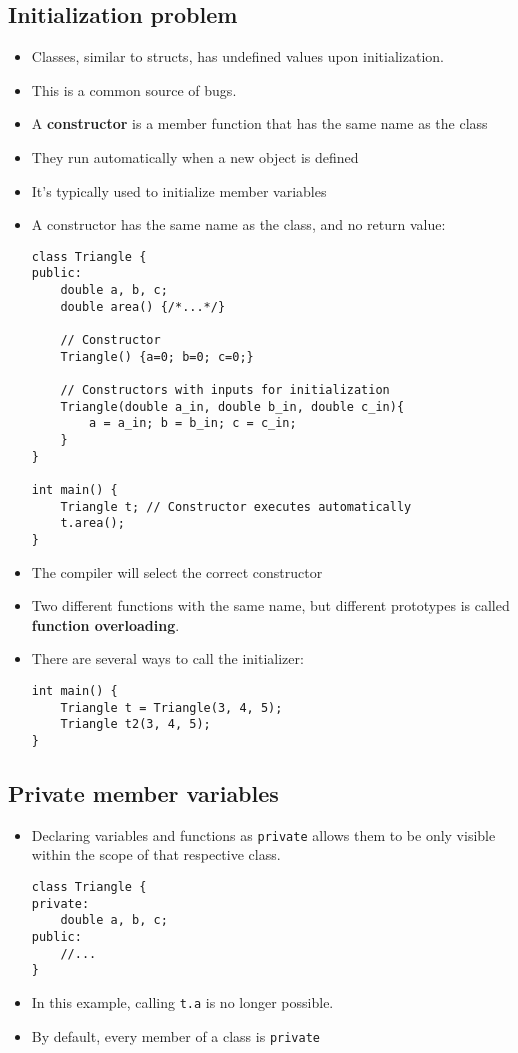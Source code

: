 \subsection{Initialization problem}
\begin{itemize}
	\item Classes, similar to structs, has undefined values upon initialization.
	\item This is a common source of bugs.
	\item A \textbf{constructor} is a member function that has the same name as the class
	\item They run automatically when a new object is defined
	\item It's typically used to initialize member variables
	\item A constructor has the same name as the class, and no return value:
\begin{lstlisting}[style=C++]
class Triangle {
public:
	double a, b, c;
	double area() {/*...*/}

	// Constructor
	Triangle() {a=0; b=0; c=0;}

	// Constructors with inputs for initialization 
	Triangle(double a_in, double b_in, double c_in){
		a = a_in; b = b_in; c = c_in;
	}
}

int main() {
	Triangle t; // Constructor executes automatically
	t.area();
}
\end{lstlisting}
	\item The compiler will select the correct constructor
	\item Two different functions with the same name, but different prototypes is called \textbf{function overloading}.
	\item There are several ways to call the initializer:
\begin{lstlisting}[style=C++]
int main() {
	Triangle t = Triangle(3, 4, 5);
	Triangle t2(3, 4, 5);
}
\end{lstlisting}
\end{itemize}

\subsection{Private member variables}
\begin{itemize}
	\item Declaring variables and functions as \lstinline[style=C++]{private} allows them to be only visible within the scope of that respective class.
\begin{lstlisting}[style=C++]
class Triangle {
private:
	double a, b, c;
public:
	//...
}
\end{lstlisting}
	\item In this example, calling \lstinline[style=C++]{t.a} is no longer possible.
	\item By default, every member of a class is \lstinline[style=C++]{private}
\end{itemize}

